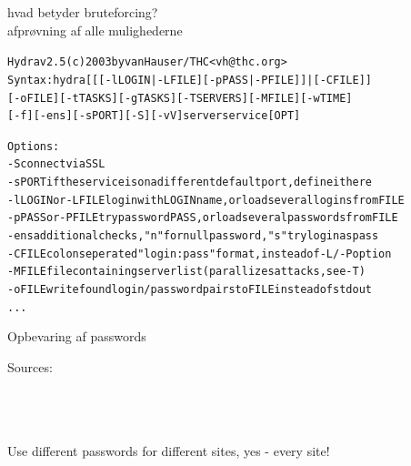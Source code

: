 \documentclass[20pt,landscape,a4paper,footrule]{foils}
\begin{document}

\begin{list1}
\item hvad betyder bruteforcing?\\
afprøvning af alle mulighederne
\end{list1}

\begin{alltt}
\small
Hydra v2.5 (c) 2003 by van Hauser / THC <vh@thc.org>
Syntax: hydra [[[-l LOGIN|-L FILE] [-p PASS|-P FILE]] | [-C FILE]] 
[-o FILE] [-t TASKS] [-g TASKS] [-T SERVERS] [-M FILE] [-w TIME] 
[-f] [-e ns] [-s PORT] [-S] [-vV] server service [OPT]

Options:
  -S        connect via SSL
  -s PORT   if the service is on a different default port, define it here
  -l LOGIN  or -L FILE login with LOGIN name, or load several logins from FILE
  -p PASS   or -P FILE try password PASS, or load several passwords from FILE
  -e ns     additional checks, "n" for null password, "s" try login as pass
  -C FILE   colon seperated "login:pass" format, instead of -L/-P option
  -M FILE   file containing server list (parallizes attacks, see -T)
  -o FILE   write found login/password pairs to FILE instead of stdout
...  
\end{alltt}




\centerline{Opbevaring af passwords}





 Sources:\\
{\footnotesize{}\\
\\
\\
}

\vskip 5mm
\centerline{Use different passwords for different sites, yes - every site!}



\end{document}
